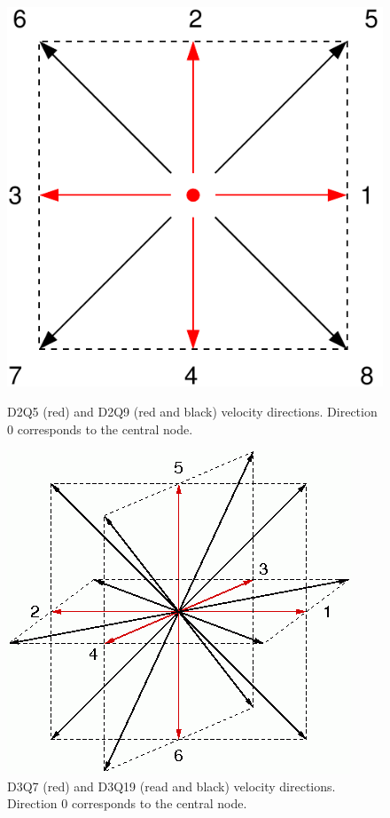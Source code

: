 \documentclass[12pt]{report}
\begin{document}
\begin{figure}[!htb]
\begin{minipage}[b]{0.475\linewidth}
\centering
\includegraphics[width=\textwidth]{D2Q9.pdf}
\caption{D2Q5 (red) and D2Q9 (red and black) velocity directions. Direction 0 corresponds to the central node.}
\label{fig:d2q9}
\end{minipage}
\hspace{0.5cm}
\begin{minipage}[b]{0.475\linewidth}
\centering
\includegraphics[width=\textwidth]{d3q19.png}
\caption{D3Q7 (red) and D3Q19 (read and black) velocity directions. Direction 0 corresponds to the central node.}
\label{fig:d3q19}
\end{minipage}
\end{figure}
\end{document}
